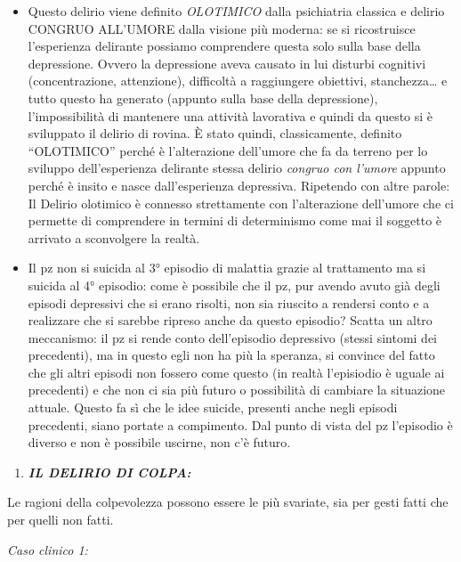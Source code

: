 \documentclass[]{article}
\begin{document}
\begin{itemize}
\item
  Questo delirio viene definito \emph{OLOTIMICO} dalla psichiatria
  classica e delirio CONGRUO ALL'UMORE dalla visione più moderna: se si
  ricostruisce l'esperienza delirante possiamo comprendere questa solo
  sulla base della depressione. Ovvero la depressione aveva causato in
  lui disturbi cognitivi (concentrazione, attenzione), difficoltà a
  raggiungere obiettivi, stanchezza\ldots{} e tutto questo ha generato
  (appunto sulla base della depressione), l'impossibilità di mantenere
  una attività lavorativa e quindi da questo si è sviluppato il delirio
  di rovina. È stato quindi, classicamente, definito ``OLOTIMICO''
  perché è l'alterazione dell'umore che fa da terreno per lo sviluppo
  dell'esperienza delirante stessa delirio \emph{congruo con l'umore}
  appunto perché è insito e nasce dall'esperienza depressiva. Ripetendo
  con altre parole: Il Delirio olotimico è connesso strettamente con
  l'alterazione dell'umore che ci permette di comprendere in termini di
  determinismo come mai il soggetto è arrivato a sconvolgere la realtà.
\item
  Il pz non si suicida al 3° episodio di malattia grazie al trattamento
  ma si suicida al 4° episodio: come è possibile che il pz, pur avendo
  avuto già degli episodi depressivi che si erano risolti, non sia
  riuscito a rendersi conto e a realizzare che si sarebbe ripreso anche
  da questo episodio? Scatta un altro meccanismo: il pz si rende conto
  dell'episodio depressivo (stessi sintomi dei precedenti), ma in questo
  egli non ha più la speranza, si convince del fatto che gli altri
  episodi non fossero come questo (in realtà l'episiodio è uguale ai
  precedenti) e che non ci sia più futuro o possibilità di cambiare la
  situazione attuale. Questo fa sì che le idee suicide, presenti anche
  negli episodi precedenti, siano portate a compimento. Dal punto di
  vista del pz l'episodio è diverso e non è possibile uscirne, non c'è
  futuro.
\end{itemize}

\begin{enumerate}
\def\labelenumi{\arabic{enumi}.}
\item
  \textbf{\emph{IL DELIRIO DI COLPA:}}
\end{enumerate}

Le ragioni della colpevolezza possono essere le più svariate, sia per
gesti fatti che per quelli non fatti.

\emph{Caso clinico 1:}
\end{document}
